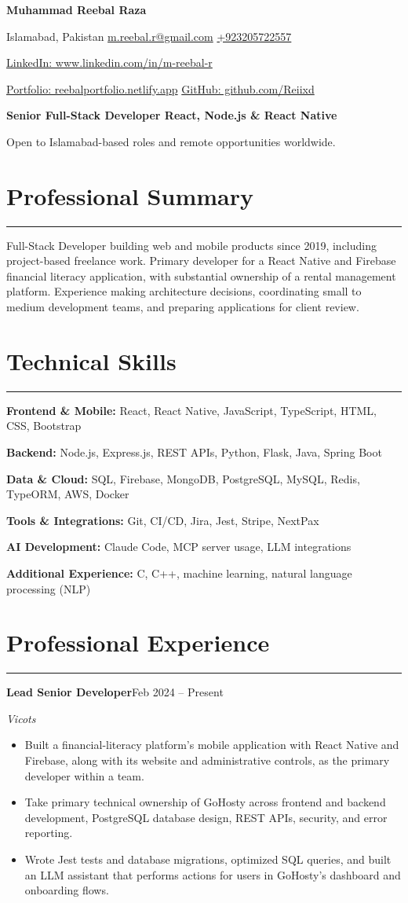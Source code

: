 \documentclass[10pt,a4paper]{article}
\newcommand{\atssection}[1]{\section*{#1}\vspace{0.5mm}\hrule\vspace{1mm}}
\newcommand{\cvskill}[2]{\textbf{#1:} #2\par\vspace{0.6mm plus 0.22fill}}
\newcommand{\cventry}[4]{\textbf{#2}\hfill #1\par\textit{#3}\par #4\par\vspace{1mm plus 0.32fill}}
\begin{document}
\fontsize{10}{11.5}\selectfont
{\LARGE\bfseries Muhammad Reebal Raza}\par\vspace{0.8mm}
Islamabad, Pakistan \textbar{} \href{mailto:m.reebal.r@gmail.com}{m.reebal.r@gmail.com} \textbar{} \href{tel:+923205722557}{+923205722557}\par
\href{https://www.linkedin.com/in/m-reebal-r/}{LinkedIn: www.linkedin.com/in/m-reebal-r}\par
\href{https://reebalportfolio.netlify.app/}{Portfolio: reebalportfolio.netlify.app} \textbar{} \href{https://github.com/Reiixd}{GitHub: github.com/Reiixd}\par
\textbf{Senior Full-Stack Developer \textbar{} React, Node.js \& React Native}\par
Open to Islamabad-based roles and remote opportunities worldwide.
\atssection{Professional Summary}
Full-Stack Developer building web and mobile products since 2019, including project-based freelance work. Primary developer for a React Native and Firebase financial literacy application, with substantial ownership of a rental management platform. Experience making architecture decisions, coordinating small to medium development teams, and preparing applications for client review.
\atssection{Technical Skills}
\cvskill{Frontend \& Mobile}{React, React Native, JavaScript, TypeScript, HTML, CSS, Bootstrap}
\cvskill{Backend}{Node.js, Express.js, REST APIs, Python, Flask, Java, Spring Boot}
\cvskill{Data \& Cloud}{SQL, Firebase, MongoDB, PostgreSQL, MySQL, Redis, TypeORM, AWS, Docker}
\cvskill{Tools \& Integrations}{Git, CI/CD, Jira, Jest, Stripe, NextPax}
\cvskill{AI Development}{Claude Code, MCP server usage, LLM integrations}
\cvskill{Additional Experience}{C, C++, machine learning, natural language processing (NLP)}
\atssection{Professional Experience}
\cventry{Feb 2024 -- Present}{Lead Senior Developer}{Vicots}{%
\begin{itemize}
\item Built a financial-literacy platform's mobile application with React Native and Firebase, along with its website and administrative controls, as the primary developer within a team.
\item Take primary technical ownership of GoHosty across frontend and backend development, PostgreSQL database design, REST APIs, security, and error reporting.
\item Wrote Jest tests and database migrations, optimized SQL queries, and built an LLM assistant that performs actions for users in GoHosty's dashboard and onboarding flows.
\end{itemize}}
\end{document}
